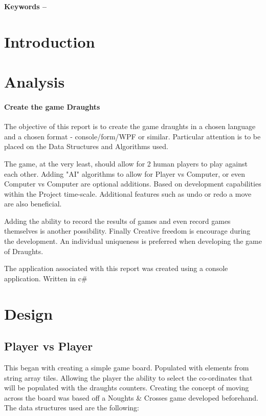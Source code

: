 \documentclass[10pt, a4paper]{article}
\title{\mytitle}
\author{\myauthor\hspace{1em}\\\contact\\Edinburgh Napier University\hspace{0.5em}-\hspace{0.5em}\mymodule}
\date{}
\begin{document}
    \maketitle
    \begin{abstract} 
        hello.
    \end{abstract}
    
    \textbf{Keywords -- }{\mykeywords}
    
    \section{Introduction}
    \section{Analysis}
    \paragraph{Create the game Draughts}
    The objective of this report is to create the game draughts in a chosen language and a chosen format - console/form/WPF or similar. Particular attention is to be placed on the Data Structures and Algorithms used.
    
    The game, at the very least, should allow for 2 human players to play against each other. Adding "AI" algorithms to allow for Player vs Computer, or even Computer vs Computer are optional additions. Based on development capabilities within the Project time-scale. Additional features such as undo or redo a move are also beneficial.
    
    Adding the ability to record the results of games and even record games themselves is another possibility. Finally Creative freedom is encourage during the development. An individual uniqueness is preferred when developing the game of Draughts.
    
    The application associated with this report was created using a console application. Written in c\#
    \section{Design}
    \subsection{{Player vs Player}}
    This began with creating a simple game board. Populated with elements from string array tiles. Allowing the player the ability to select the co-ordinates that will be populated with the draughts counters. Creating the concept of moving across the board was based off a Noughts \& Crosses game developed beforehand. 
    The data structures used are the following:
    
\end{document}
